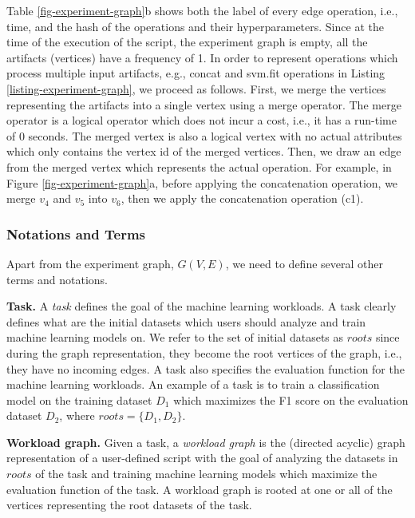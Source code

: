 Table \ref{fig-experiment-graph}b shows both the label of every edge operation, i.e., time, and the hash of the operations and their hyperparameters.
Since at the time of the execution of the script, the experiment graph is empty, all the artifacts (vertices) have a frequency of 1.
In order to represent operations which process multiple input artifacts, e.g., concat and svm.fit operations in Listing \ref{listing-experiment-graph}, we proceed as follows.
First, we merge the vertices representing the artifacts into a single vertex using a merge operator.
The merge operator is a logical operator which does not incur a cost, i.e., it has a run-time of 0 seconds.
The merged vertex is also a logical vertex with no actual attributes which only contains the vertex id of the merged vertices.
Then, we draw an edge from the merged vertex which represents the actual operation.
For example, in Figure \ref{fig-experiment-graph}a, before applying the concatenation operation, we merge $v_4$ and $v_5$ into $v_6$, then we apply the concatenation operation (c1).
 
\subsubsection{Notations and Terms}\label{notations-terms}
Apart from the experiment graph, $G(V, E)$, we need to define several other terms and notations.

\textbf{Task.} A \textit{task} defines the goal of the machine learning workloads. 
A task clearly defines what are the initial datasets which users should analyze and train machine learning models on. 
We refer to the set of initial datasets as $roots$ since during the graph representation, they become the root vertices of the graph, i.e., they have no incoming edges.
A task also specifies the evaluation function for the machine learning workloads.
An example of a task is to train a classification model on the training dataset $D_1$ which maximizes the F1 score on the evaluation dataset $D_2$, where $roots = \{D_1, D_2\}$.

\textbf{Workload graph.} Given a task, a \textit{workload graph} is the (directed acyclic) graph representation of a user-defined script with the goal of analyzing the datasets in $roots$ of the task and training machine learning models which maximize the evaluation function of the task.
A workload graph is rooted at one or all of the vertices representing the root datasets of the task.

